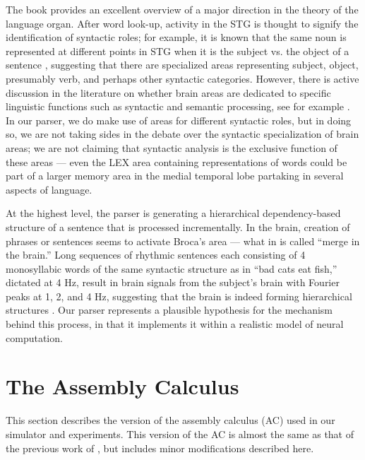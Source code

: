 \documentclass[11pt,a4paper]{article}
\begin{document}
The book \citet{friederici} provides an excellent overview of a major direction in the theory of the language organ. After word look-up, activity in the STG is thought to signify the identification of syntactic roles; for example, it is known that the same noun is represented at different points in STG when it is the subject vs. the object of a sentence \cite{Frankland}, suggesting that there are specialized areas representing subject, object, presumably verb, and perhaps other syntactic categories. However, there is active discussion in the literature on whether brain areas are dedicated to specific linguistic functions such as syntactic and semantic processing, see for example \citet{Fedorenko2020,FedorenkoNetworks,Pylkkanen}. In our parser, we do make use of areas for different syntactic roles, but in doing so, we are not taking sides in the debate over the syntactic specialization of brain areas; we are not claiming that syntactic analysis is the exclusive function of these areas --- even the LEX area containing representations of words could be part of a larger memory area in the medial temporal lobe partaking in several aspects of language. %

At the highest level, %
the parser is generating a hierarchical dependency-based structure of a sentence that is processed incrementally. In the brain, creation of phrases or sentences seems to activate Broca's area --- what in \citet{ZaccarellaF} is called ``merge in the brain.''  Long sequences of rhythmic sentences each consisting of 4 monosyllabic words of the same syntactic structure as in ``bad cats eat fish,'' dictated at 4 Hz, result in brain signals from the subject's brain with Fourier peaks at 1, 2, and 4 Hz, suggesting that the brain is indeed forming hierarchical structures \cite{Poeppel}. Our parser represents a plausible hypothesis for the mechanism behind this process, in that it implements it within a realistic model of neural computation.  

\section{The Assembly Calculus} This section describes the version of the assembly calculus (AC) used in our simulator and experiments. This version of the AC is almost the same as that of the previous work of \citet{PNAS}, but includes minor modifications described here.
\end{document}
